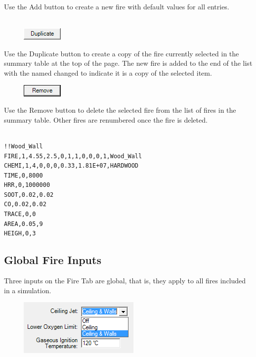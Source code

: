 Use the Add button to create a new fire with default values for all entries. \\~ \\

\begin{figure}
  \includegraphics[width=0.781in]{FIGURES/Input_File/Duplicate_Button}
\end{figure}

Use the Duplicate button to create a copy of the fire currently selected in the summary table at the top of the page. The new fire is added to the end of the list with the named changed to indicate it is a copy of the selected item. \\

\begin{figure}
  \includegraphics[width=0.781in]{FIGURES/Input_File/Remove_Button}
\end{figure}

Use the Remove button to delete the selected fire from the list of fires in the summary table.  Other fires are renumbered once the fire is deleted. \\~ \\

\begin{lstlisting}
!!Wood_Wall
FIRE,1,4.55,2.5,0,1,1,0,0,0,1,Wood_Wall
CHEMI,1,4,0,0,0,0.33,1.81E+07,HARDWOOD
TIME,0,8000
HRR,0,1000000
SOOT,0.02,0.02
CO,0.02,0.02
TRACE,0,0
AREA,0.05,9
HEIGH,0,3
\end{lstlisting}

\subsection{Global Fire Inputs}

Three inputs on the Fire Tab are global, that is, they apply to all fires included in a simulation.

\begin{figure}
  \includegraphics[width=2.313in]{FIGURES/Input_File/Ceiling_Jet}
\end{figure}

